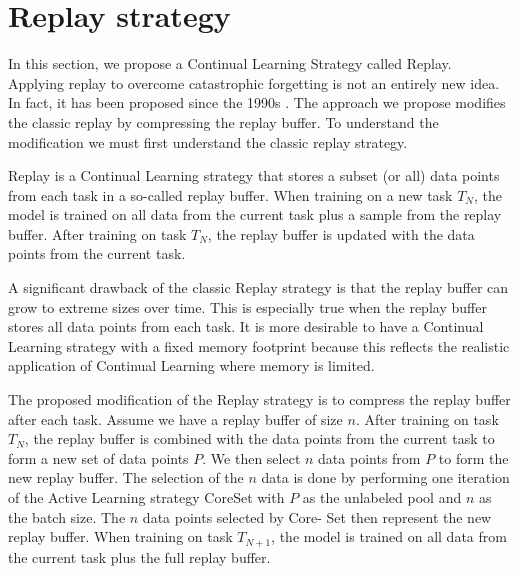\section{Replay strategy}
\label{sec:Methodology:ReplayStrategy}
In this section, we propose a Continual Learning Strategy called Replay. Applying replay to overcome catastrophic forgetting is not an entirely new idea. In fact, it
has been proposed since the 1990s \cite{robins1995catastrophic}. The approach we propose modifies the classic replay by compressing the replay buffer. To understand the modification
we must first understand the classic replay strategy. \par
Replay is a Continual Learning strategy that stores a subset (or all) data points from each task in a so-called replay buffer. When training on a new task $T_N$, the model is trained 
on all data from the current task plus a sample from the replay buffer. After training on task $T_N$, the replay buffer is updated with the data points from the current task. \par
A significant drawback of the classic Replay strategy is that the replay buffer can grow to extreme sizes over time. This is especially true when the replay buffer stores all data points from
each task. It is more desirable to have a Continual Learning strategy with a fixed memory footprint because this reflects the realistic application of Continual Learning where memory 
is limited. \par
The proposed modification of the Replay strategy is to compress the replay buffer after each task. Assume we have a replay buffer of size $n$. After training on task $T_N$, the replay buffer
is combined with the data points from the current task to form a new set of data points $P$. We then select $n$ data points from $P$ to form the new replay buffer. The selection of the $n$ data
is done by performing one iteration of the Active Learning strategy CoreSet \cite{sener2018active} with $P$ as the unlabeled pool and $n$ as the batch size. The $n$ data points selected by Core-
Set then represent the new replay buffer. When training on task $T_{N+1}$, the model is trained on all data from the current task plus the full replay buffer.

